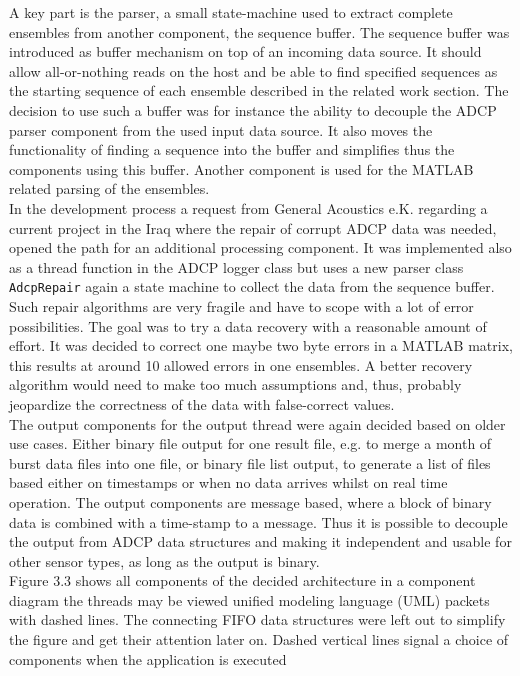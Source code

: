 A key part is the parser, a small state-machine used to extract complete ensembles from another component, the sequence buffer. The sequence buffer was introduced as buffer mechanism on top of an incoming data source. It should allow all-or-nothing reads on the host and be able to find specified sequences as the starting sequence of each ensemble described in the related work section. The decision to use such a buffer was for instance the ability to decouple the ADCP parser component from the used input data source. It also moves the functionality of finding a sequence into the buffer and simplifies thus the components using this buffer. Another component is used for the MATLAB related parsing of the ensembles.\\ In the development process a request from General Acoustics e.K. regarding a current project in the Iraq where the repair of corrupt ADCP data was needed, opened the path for an additional processing component. It was implemented also as a thread function in the ADCP logger class but uses a new parser class \texttt{AdcpRepair} again a state machine to collect the data from the sequence buffer. Such repair algorithms are very fragile and have to scope with a lot of error possibilities. The goal was to try a data recovery with a reasonable amount of effort. It was decided to correct one maybe two byte errors in a MATLAB matrix, this results at around 10 allowed errors in one ensembles. A better recovery algorithm would need to make too much assumptions and, thus, probably jeopardize the correctness of the data with false-correct values.\\
The output components for the output thread were again decided based on older use cases. Either binary file output for one result file, e.g. to merge a month of burst data files into one file, or binary file list output, to generate a list of files based either on timestamps or when no data arrives whilst on real time operation. The output components are message based, where a block of binary data is combined with a time-stamp to a message. Thus it is possible to decouple the output from ADCP data structures and making it independent and usable for other sensor types, as long as the output is binary.\\
Figure 3.3 shows all components of the decided architecture in a component diagram the threads may be viewed unified modeling language (UML) packets with dashed lines. The connecting FIFO data structures were left out to simplify the figure and get their attention later on. Dashed vertical lines signal a choice of components when the application is executed\\ 
